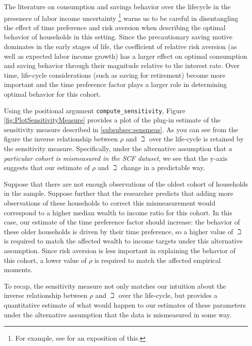 \documentclass[titlepage, headings=optiontotocandhead]{\econtex}
\begin{document}
The literature on consumption and savings behavior over the lifecycle in
the presenece of labor income uncertainty \footnote{For example, see \cite{gpLifecycle} for an 
exposition of this.} warns us to be careful in disentangling the effect of time preference and
risk aversion when describing the optimal behavior of households in this setting.
Since the precautionary saving motive dominates in the early stages of life, the coefficient of relative
risk aversion (as well as expected labor income growth) has a larger effect on optimal consumption and 
saving behavior through their magnitude relative to the
interest rate. Over time, life-cycle considerations (such as saving for retirement) become more important and
the time preference factor plays a larger role in determining optimal behavior for this cohort.

Using the positional argument \texttt{compute\_sensitivity}, Figure \ref{fig:PlotSensitivityMeasure}
provides a plot of the plug-in estimate of the sensitivity measure described in \ref{subsubsec:sensmeas}. As you can see from 
the figure the inverse relationship between $\rho$ and $\beth$ over the life-cycle 
is retained by the sensitivity measure. Specifically, under the alternative 
assumption that \textit{a particular cohort is mismeasured in the SCF dataset}, we see that the 
y-axis suggests that our estimate of $\rho$ and $\beth$ change in a predictable way. 

Suppose that there are not enough observations of the oldest cohort of households in the
sample. Suppose further that the researcher predicts that adding more observations of these households
to correct this mismeasurement would correspond to a higher median wealth to income ratio
for this cohort. In this case, our estimate of the time preference factor should increase: 
the behavior of these older households is driven by their time preference, 
so a higher value of $\beth$ is required to match the affected wealth to income targets under this 
alternative assumption. Since risk aversion is less important in explaining the behavior of this cohort, 
a lower value of $\rho$ is required to match the affected empirical moments. 

To recap, the sensitivity measure not only matches our intuition about the inverse relationship between 
$\rho$ and $\beth$ over the life-cycle, but provides a quantitative estimate of what would happen to 
our estimates of these parameters under the alternative assumption that the data is mismeasured in some way.
\end{document}
